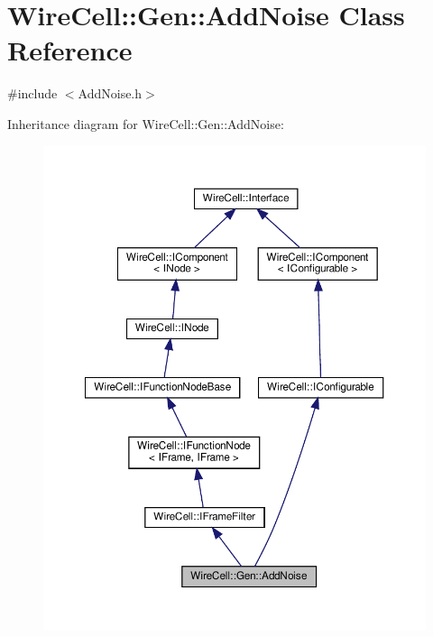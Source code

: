 \hypertarget{class_wire_cell_1_1_gen_1_1_add_noise}{}\section{Wire\+Cell\+:\+:Gen\+:\+:Add\+Noise Class Reference}
\label{class_wire_cell_1_1_gen_1_1_add_noise}


{\ttfamily \#include $<$Add\+Noise.\+h$>$}



Inheritance diagram for Wire\+Cell\+:\+:Gen\+:\+:Add\+Noise\+:
\nopagebreak
\begin{figure}[H]
\begin{center}
\leavevmode
\includegraphics[width=350pt]{class_wire_cell_1_1_gen_1_1_add_noise__inherit__graph}
\end{center}
\end{figure}


